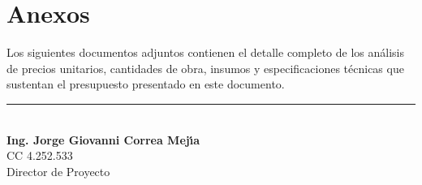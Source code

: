 ﻿\documentclass[12pt]{article}
\begin{document}
\section{Anexos}

Los siguientes documentos adjuntos contienen el detalle completo de los análisis de precios
unitarios, cantidades de obra, insumos y especificaciones técnicas que sustentan el presupuesto
presentado en este documento.

\vspace{1cm}
\begin{center}
\rule{8cm}{0.5pt}\\[0.3cm]
{\bfseries Ing. Jorge Giovanni Correa Mej\'{\i}a}\\[0.1cm]
CC 4.252.533\\[0.1cm]
Director de Proyecto
\end{center}
\end{document}
